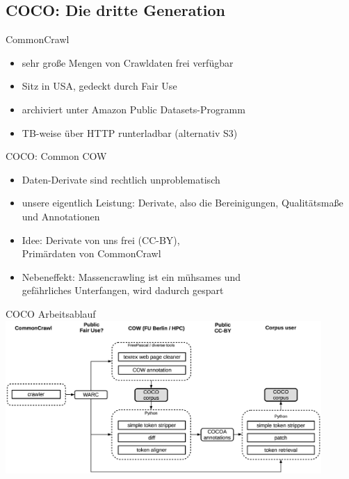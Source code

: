 \subsection{COCO: Die dritte Generation}

\begin{frame}
	{CommonCrawl}
	\begin{itemize}
	  \item sehr große Mengen von Crawldaten frei verfügbar
	  \item Sitz in USA, gedeckt durch Fair Use
	  \item archiviert unter Amazon Public Datasets-Programm
	  \item TB-weise über HTTP runterladbar (alternativ S3)
	\end{itemize}
\end{frame}


\begin{frame}
	{COCO: Common COW}
	\begin{itemize}
	  \item Daten-Derivate sind rechtlich unproblematisch
	  \item unsere eigentlich Leistung: \alert{Derivate}, also die Bereinigungen, Qualitätsmaße und Annotationen
	  \item Idee: \alert{Derivate von uns frei (CC-BY),\\Primärdaten von CommonCrawl}

	  \vspace{0.5cm}

	  \item Nebeneffekt: Massencrawling ist ein mühsames und\\gefährliches Unterfangen, wird dadurch gespart
	\end{itemize}
\end{frame}


\begin{frame}
	{COCO Arbeitsablauf}
	\centerinag
	\includegraphics[width=0.9\textwidth]{graphics/workflow}
\end{frame}


